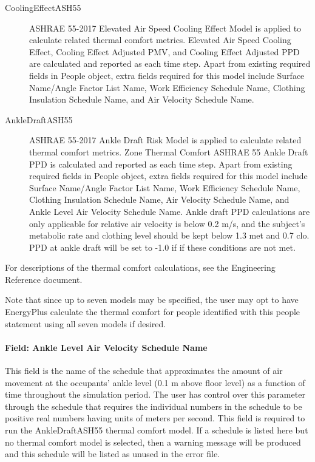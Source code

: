 \begin{description}
  \item[CoolingEffectASH55] 
  ASHRAE 55-2017 Elevated Air Speed Cooling Effect Model is applied to calculate related thermal comfort metrics. Elevated Air Speed Cooling Effect, Cooling Effect Adjusted PMV, and Cooling Effect Adjusted PPD are calculated and reported as each time step. Apart from existing required fields in People object, extra fields required for this model include Surface Name/Angle Factor List Name, Work Efficiency Schedule Name, Clothing Insulation Schedule Name, and Air Velocity Schedule Name.

  \item[AnkleDraftASH55] 
  ASHRAE 55-2017 Ankle Draft Risk Model is applied to calculate related thermal comfort metrics. Zone Thermal Comfort ASHRAE 55 Ankle Draft PPD is calculated and reported as each time step. Apart from existing required fields in People object, extra fields required for this model include Surface Name/Angle Factor List Name, Work Efficiency Schedule Name, Clothing Insulation Schedule Name, Air Velocity Schedule Name, and Ankle Level Air Velocity Schedule Name. Ankle draft PPD calculations are only applicable for relative air velocity is below 0.2 m/s, and the subject’s metabolic rate and clothing level should be kept below 1.3 met and 0.7 clo. PPD at ankle draft will be set to -1.0 if if these conditions are not met.

\end{description}

 For descriptions of the thermal comfort calculations, see the Engineering Reference document.

 Note that since up to seven models may be specified, the user may opt to have EnergyPlus calculate the thermal comfort for people identified with this people statement using all seven models if desired. 


\paragraph{Field: Ankle Level Air Velocity Schedule Name}\label{field-ankle-level-air-velocity-schedule-name}

This field is the name of the schedule that approximates the amount of air movement at the occupants' ankle level (0.1 m above floor level) as a function of time throughout the simulation period. The user has control over this parameter through the schedule that requires the individual numbers in the schedule to be positive real numbers having units of meters per second. This field is required to run the AnkleDraftASH55 thermal comfort model. If a schedule is listed here but no thermal comfort model is selected, then a warning message will be produced and this schedule will be listed as unused in the error file.

